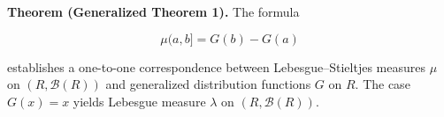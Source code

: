 \textbf{Theorem (Generalized Theorem 1).} The formula

$$\mu(a, b] = G(b) - G(a)$$

establishes a one-to-one correspondence between Lebesgue--Stieltjes measures $\mu$ on $(R, \mathcal{B}(R))$ and generalized distribution functions $G$ on $R$. The case $G(x) = x$ yields Lebesgue measure $\lambda$ on $(R, \mathcal{B}(R))$.
